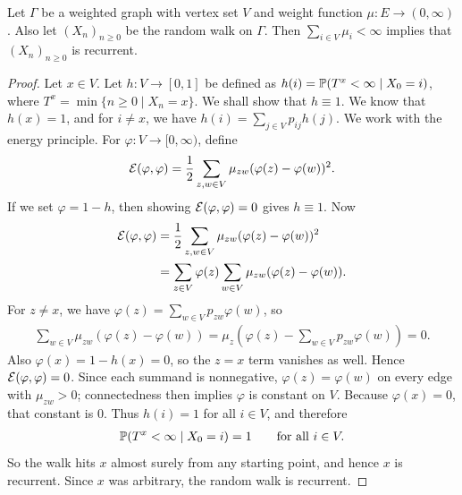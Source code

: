 \begin{theorem}
    Let $\Gamma$ be a weighted graph with vertex set $V$ and weight function $\mu:E \to (0,\infty)$. Also let $(X_{n})_{n \geq 0}$ be the random walk on $\Gamma$. Then $\sum_{i \in V} \mu_{i} < \infty$ implies that $(X_{n})_{n \geq 0}$ is recurrent.
\end{theorem}
\begin{proof}
    Let $x \in V$. Let $h:V \to [0,1]$ be defined as $h(i) = \mathbb{P}(T^{x} < \infty \mid X_{0}=i)$, where $T^{x} = \min\{n \geq 0 \mid X_{n} = x\}$. We shall show that $h \equiv 1$. We know that $h(x) = 1$, and for $i \neq x$, we have $h(i) = \sum_{j \in V} p_{ij}h(j)$.
We work with the energy principle. For $\varphi:V \to [0,\infty)$, define
\begin{align}
    \mathcal{E}(\varphi,\varphi) = \frac{1}{2} \sum_{z,w \in V} \mu_{zw}(\varphi(z)-\varphi(w))^{2}.
\end{align}
If we set $\varphi=1-h$, then showing $\mathcal{E}(\varphi,\varphi)=0$ gives $h\equiv 1$. Now
\begin{align}
    \mathcal{E}(\varphi,\varphi)
    &= \frac{1}{2} \sum_{z,w \in V} \mu_{zw}(\varphi(z)-\varphi(w))^{2} \\
    &= \sum_{z\in V} \varphi(z) \sum_{w\in V} \mu_{zw}(\varphi(z)-\varphi(w)).
\end{align}
For $z\neq x$, we have $\varphi(z)=\sum_{w\in V} p_{zw}\varphi(w)$, so
\begin{align}
    \sum_{w \in V} \mu_{zw}(\varphi(z)-\varphi(w))
    = \mu_z\left(\varphi(z)-\sum_{w\in V} p_{zw}\varphi(w)\right)=0.
\end{align}
Also $\varphi(x)=1-h(x)=0$, so the $z=x$ term vanishes as well. Hence $\mathcal{E}(\varphi,\varphi)=0$. Since each summand is nonnegative, $\varphi(z)=\varphi(w)$ on every edge with $\mu_{zw}>0$; connectedness then implies $\varphi$ is constant on $V$. Because $\varphi(x)=0$, that constant is $0$. Thus $h(i)=1$ for all $i\in V$, and therefore
\begin{align}
    \mathbb{P}(T^x<\infty \mid X_0=i)=1 \qquad \text{for all } i\in V.
\end{align}
So the walk hits $x$ almost surely from any starting point, and hence $x$ is recurrent. Since $x$ was arbitrary, the random walk is recurrent.
\end{proof}

